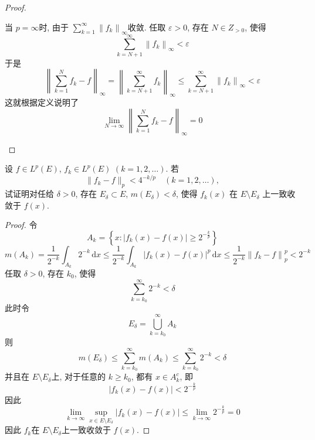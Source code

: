 \documentclass[../main.tex]{subfiles}
\begin{document}
\begin{proof}
\begin{enumerate}
    当 \(  p= \infty  \)时, 由于 \(  \sum _{k= 1}^{\infty}\left\| f_{k} \right\|_{\infty}  \)收敛. 任取 \(   \varepsilon > 0  \), 存在 \(  N\in Z_{> 0}  \), 使得   \[
    \sum _{k = N+ 1}^{\infty}\left\| f_{k} \right\|_{\infty}<  \varepsilon 
    \]    于是 \[
    \left\| \sum _{k= 1}^{N}f_{k} -f \right\|_{\infty} = \left\| \sum _{k= N+ 1}^{\infty}f_{k}  \right\|_{\infty}\le \sum _{k= N+ 1}^{\infty}\left\| f_{k} \right\|_{\infty}<  \varepsilon 
    \] 这就根据定义说明了 \[
    \lim_{N\to \infty}\left\| \sum _{k= 1}^{N}f_{k}-f \right\|_{\infty}= 0
    \]
  \end{enumerate}
  
\end{proof}

\begin{exercise}{}{}
 设 $f\in L^p(E)$, $f_k\in L^p(E)$ $(k=1,2,\dots)$. 若 
\[
\lVert f_k-f\rVert_p<4^{-k/p}\quad (k=1,2,\dots),
\]
试证明对任给 $\delta>0$, 存在 $E_{\delta}\subset E$, $m(E_{\delta})<\delta$, 使得 $f_k(x)$ 在 $E\setminus E_{\delta}$ 上一致收敛于 $f(x)$.
\end{exercise}


\begin{proof}
    令 \[
    A_{k}= \left\{ x: \left| f_{k}\left( x \right)-f\left( x \right)   \right|\ge 2^{-\frac{k}{p}} \right\}
    \] \[
    m\left( A_{k} \right)=   \frac{1 }{2^{-k} } \int_{A_{k}}2^{-k}\,\mathrm{d} x\le \frac{1 }{2^{-k} } \int_{A_{k}} \left| f_{k}\left( x \right)-f\left( x \right)   \right|^{p}\,\mathrm{d} x\le \frac{1 }{2^{-k} }\left\| f_{k}-f \right\|_{p}^{p}<2^{-k}
    \]任取 \(   \delta > 0  \), 存在 \(  k_0  \), 使得 \[
    \sum _{k = k_0}^{\infty}2^{-k}<  \delta 
    \]  此时令 \[
    E_{ \delta }= \bigcup _{k= k_0}^{\infty}A_{k}
    \]则 \[
    m\left( E_{ \delta } \right)\le \sum _{k= k_0}^{\infty}m\left( A_{k} \right)\le \sum _{k= k_0}^{\infty}2^{-k}  <  \delta 
    \]并且在 \( E\setminus E_{ \delta } \)上, 对于任意的 \(  k\ge k_0  \), 都有 \(  x\in A_{k} ^{c} \), 即 \[
    \left| f_{k}\left( x \right)-f\left( x \right)   \right| < 2^{-\frac{k}{p}}
    \]   因此 \[
    \lim_{k\to \infty}\sup _{x\in E\setminus E_{ \delta }}\left| f_{k}\left( x \right)-f\left( x \right)   \right|\le  \lim_{k\to \infty}2^{-\frac{k}{p}}= 0
    \]因此 \(  f_{k}  \)在 \(  E\setminus E_{ \delta }  \)上一致收敛于 \(  f\left( x \right)   \).   
\end{proof}
\end{document}
